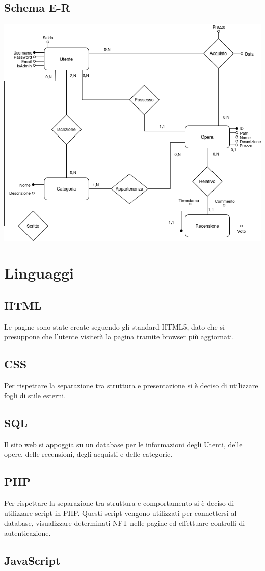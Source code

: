 \documentclass[10pt]{article}
\begin{document}
\subsection{Schema E-R}
\begin{center}
    \includegraphics[width=0.6\linewidth]{schema_ristrutturato.png}
\end{center}

\section{Linguaggi}
\subsection{HTML}
Le pagine sono state create seguendo gli standard HTML5, dato che si presuppone che l'utente visiterà la pagina tramite browser più aggiornati.
\subsection{CSS}
Per rispettare la separazione tra struttura e presentazione si è deciso di utilizzare fogli di stile esterni.
\subsection{SQL}
Il sito web si appoggia su un database per le informazioni degli Utenti, delle opere, delle recensioni, degli acquisti e delle categorie.
\subsection{PHP} 
Per rispettare la separazione tra struttura e comportamento si è deciso di utilizzare script in PHP. Questi script vengono utilizzati per connettersi al database, visualizzare determinati NFT nelle pagine ed effettuare controlli di autenticazione.
\subsection{JavaScript}
\end{document}
